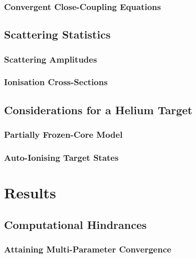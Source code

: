 \documentclass[draft]{article}
\begin{document}
\subsubsection{Convergent Close-Coupling Equations}
\label{sec:ccc-equations}

\subsection{Scattering Statistics}
\label{sec:scat-statistics}

\subsubsection{Scattering Amplitudes}
\label{sec:scat-amplitudes}

\subsubsection{Ionisation Cross-Sections}
\label{sec:ion-cross-sections}

\subsection{Considerations for a Helium Target}
\label{sec:he-target}

\subsubsection{Partially Frozen-Core Model}
\label{sec:frozen-core-model}

\subsubsection{Auto-Ionising Target States}
\label{sec:auto-ion-states}

\section{Results}
\label{sec:results}

\subsection{Computational Hindrances}
\label{sec:computational-hindrances}

\subsubsection{Attaining Multi-Parameter Convergence}
\label{sec:attaining-convergence}
\end{document}
